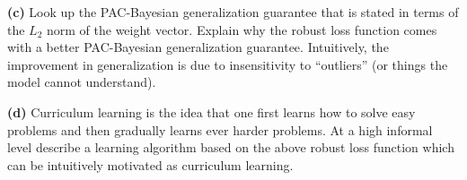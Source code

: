 \documentclass{article}
\newcommand{\solution}[1]{}
\begin{document}
\medskip
{\bf (c)} Look up the PAC-Bayesian generalization guarantee that is stated in terms of the $L_2$ norm of the weight vector.
Explain why the robust loss function comes with a better PAC-Bayesian generalization guarantee.  Intuitively, the improvement in generalization
is due to insensitivity to ``outliers'' (or things the model cannot understand).

\solution{
  The $L_2$ PAC-Bayeisan guarantee in the notes is
  $${\cal L}_\sigma(\Phi) \leq \frac{10}{9}\left(\hat{\cal L}_\sigma(\Phi) + \frac{5\lmax}{N}\left(\frac{||\Phi -\Phi_{\mathrm{init}}||^2}{2\sigma^2} + \ln \frac{1}{\delta}\right)\right)$$
  Reducing $\lmax$ both reduces $\hat{L}_\sigma(\Phi)$ and reduces the penalty for the model complexity (the norm squared of the distance from the initialization).
}

\medskip
{\bf (d)} Curriculum learning is the idea that one first learns how to solve easy problems and then gradually learns ever harder problems. At a high informal level describe a learning algorithm based on the above robust loss function
which can be intuitively motivated as curriculum learning.


\solution{
  Easier problems should correspond to cases where the cross entropy loss can be made small.  So setting $\lmax$ to be smallish will focus the model on the easy problems while ignoring the hard problems.
  Gradually increasing $\lmax$ will gradually pay more attention to the harder problems.

  \medskip
  Another possible answer is that holding $\lmax$ fixed will focus first on the easy problems ignoring the hard problems but as the understanding of easy problems improves the harder problems become easy problems and
  we automatically gradually pay attention to harder and harder problems even with a fixed value of $\lmax$.
}
\end{document}
